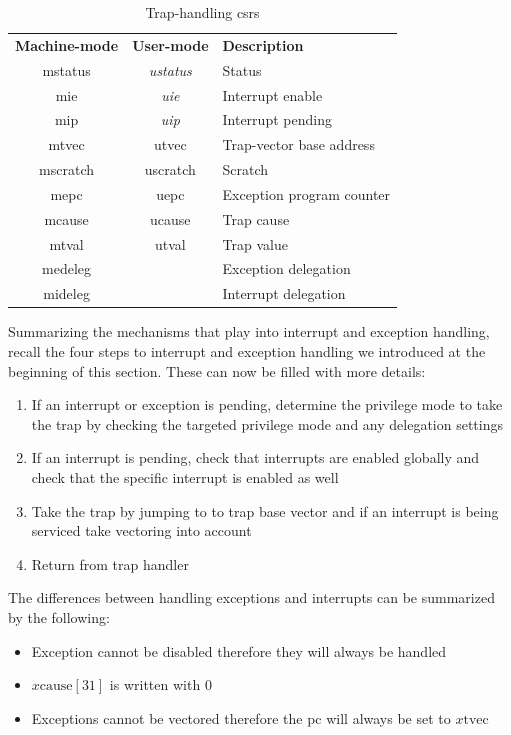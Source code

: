 \begin{table}
    \centering
    \begin{tabular}{| c c || l |}
        \hline
        \textbf{Machine-mode} & \textbf{User-mode} & \textbf{Description} \\
        \acrshort{mstatus} & \textit{\acrshort{ustatus}} & Status \\
        \acrshort{mie} & \textit{\acrshort{uie}} & Interrupt enable \\
        \acrshort{mip} & \textit{\acrshort{uip}} & Interrupt pending \\
        \acrshort{mtvec} & \acrshort{utvec} & Trap-vector base address \\
        \acrshort{mscratch} & \acrshort{uscratch} & Scratch \\
        \acrshort{mepc} & \acrshort{uepc} & Exception program counter \\
        \acrshort{mcause} & \acrshort{ucause} & Trap cause \\
        \acrshort{mtval} & \acrshort{utval} & Trap value \\
        \acrshort{medeleg} & & Exception delegation \\
        \acrshort{mideleg} & & Interrupt delegation \\
        \hline
    \end{tabular}
    \caption{Trap-handling \glspl{csr}}
    \label{tbl:trap-csrs}
\end{table}

Summarizing the mechanisms that play into interrupt and exception handling, recall the four steps to interrupt and exception handling we introduced at the beginning of this section.
These can now be filled with more details:
\begin{enumerate}
    \item If an interrupt or exception is pending, determine the privilege mode to take the trap by checking the targeted privilege mode and any delegation settings
    \item If an interrupt is pending, check that interrupts are enabled globally and check that the specific interrupt is enabled as well
    \item Take the trap by jumping to to trap base vector and if an interrupt is being serviced take vectoring into account
    \item Return from trap handler
\end{enumerate}

The differences between handling exceptions and interrupts can be summarized by the following:
\begin{itemize}
    \item Exception cannot be disabled therefore they will always be handled
    \item $ x\text{cause}[31] $ is written with $ 0 $
    \item Exceptions cannot be vectored therefore the \gls{pc} will always be set to $ x\text{tvec} $
\end{itemize}

